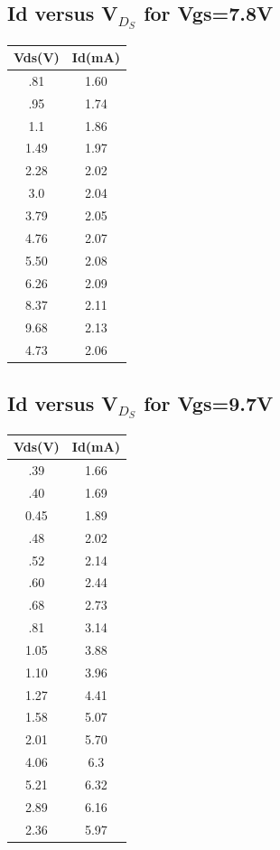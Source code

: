 \documentclass[12pt]{article}
\begin{document}
\subsection{Id versus V$_D_S$ for Vgs=7.8V}
\begin{center}
 \begin{tabular}{|| c | c||} 
 \hline
 Vds(V) & Id(mA) \\ [0.5ex] 
 \hline\hline
 .81&1.60\\
 \hline
 .95&1.74\\
 \hline
 1.1&1.86\\
 \hline
 1.49&1.97\\
 \hline
 2.28&2.02\\
 \hline
 3.0&2.04\\
 \hline
 3.79&2.05\\
 \hline
 4.76&2.07\\
 \hline
 5.50&2.08\\
 \hline
 6.26&2.09\\
 \hline
 8.37&2.11\\
 \hline
 9.68&2.13\\
 \hline
 4.73&2.06\\
 \hline
\end{tabular}
\end{center}

\subsection{Id versus V$_D_S$ for Vgs=9.7V}
\begin{center}
 \begin{tabular}{|| c | c||} 
 \hline
 Vds(V) & Id(mA) \\ [0.5ex] 
 \hline\hline
 .39&1.66\\
 \hline
 .40&1.69\\
 \hline
 0.45&1.89\\
 \hline
 .48&2.02\\
 \hline
 .52&2.14\\
 \hline
 .60&2.44\\
 \hline
 .68&2.73\\
 \hline
 .81&3.14\\
 \hline
 1.05&3.88\\
 \hline
 1.10&3.96\\
 \hline
 1.27&4.41\\
 \hline
 1.58&5.07\\
 \hline
 2.01&5.70\\
 \hline
 4.06&6.3\\
 \hline
 5.21&6.32\\
 \hline
 2.89&6.16\\
 \hline
 2.36&5.97\\
 \hline
\end{tabular}
\end{center}
\end{document}
